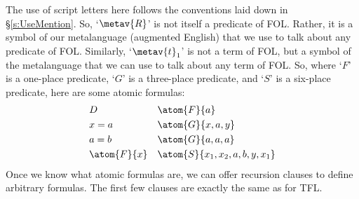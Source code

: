 The use of script letters here follows the conventions laid down in \S\ref{s:UseMention}. So, `$\metav{R}$' is not itself a predicate of FOL. Rather, it is a symbol of our metalanguage (augmented English) that we use to talk about any predicate of FOL. Similarly, `$\metav{t}_1$' is not a term of FOL, but a symbol of the metalanguage that we can use to talk about any term of FOL. So, where `$F$' is a one-place predicate, `$G$' is a three-place predicate, and `$S$' is a six-place predicate, here are some atomic formulas:
	\begin{align*}
		& D &&  \atom{F}{a}\\
		& x = a && \atom{G}{x,a,y}\\
		& a = b && \atom{G}{a,a,a}\\
		& \atom{F}{x} && \atom{S}{x_1, x_2, a, b, y, x_1}\\
	\end{align*}
Once we know what atomic formulas are, we can offer recursion clauses to define arbitrary formulas. The first few clauses are exactly the same as for TFL.
